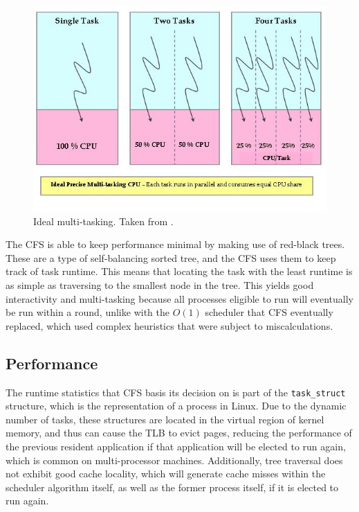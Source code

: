 \documentclass{sig-alternate-10pt}
\begin{document}
\begin{figure}
	\begin{center}
		\includegraphics[width=0.9\linewidth]{fig/mutlitasking.jpg}
		\caption{
			Ideal multi-tasking. Taken from \protect\cite{fig:multitask}.
		}
		\label{fig:cfs_multitask}
	\end{center}
\end{figure}

The CFS is able to keep performance minimal by making use of red-black trees. These are a type of self-balancing sorted tree, and the CFS uses them to keep track of task runtime. This means that locating the task with the least runtime is as simple as traversing to the smallest node in the tree. This yields good interactivity and multi-tasking because all processes eligible to run will eventually be run within a round, unlike with the $O(1)$ scheduler that CFS eventually replaced, which used complex heuristics that were subject to miscalculations.

\subsection{Performance}
The runtime statistics that CFS basis its decision on is part of the \verb|task_struct| structure, which is the representation of a process in Linux. Due to the dynamic number of tasks, these structures are located in the virtual region of kernel memory, and thus can cause the TLB to evict pages, reducing the performance of the previous resident application if that application will be elected to run again, which is common on multi-processor machines. Additionally, tree traversal does not exhibit good cache locality, which will generate cache misses within the scheduler algorithm itself, as well as the former process itself, if it is elected to run again.
\end{document}
